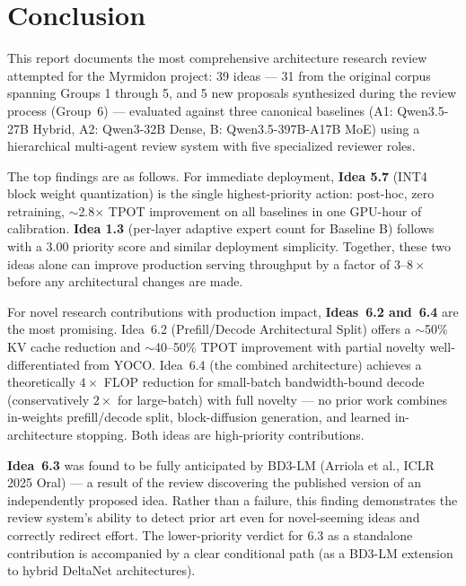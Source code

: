 \documentclass[11pt]{article}
\begin{document}
\section{Conclusion}
\label{sec:conclusion}

This report documents the most comprehensive architecture research review attempted for the Myrmidon project: 39 ideas --- 31 from the original corpus spanning Groups 1 through 5, and 5 new proposals synthesized during the review process (Group~6) --- evaluated against three canonical baselines (A1: Qwen3.5-27B Hybrid, A2: Qwen3-32B Dense, B: Qwen3.5-397B-A17B MoE) using a hierarchical multi-agent review system with five specialized reviewer roles.

The top findings are as follows. For immediate deployment, \textbf{Idea 5.7} (INT4 block weight quantization) is the single highest-priority action: post-hoc, zero retraining, $\sim$2.8$\times$ TPOT improvement on all baselines in one GPU-hour of calibration. \textbf{Idea 1.3} (per-layer adaptive expert count for Baseline B) follows with a 3.00 priority score and similar deployment simplicity. Together, these two ideas alone can improve production serving throughput by a factor of $3$--$8\times$ before any architectural changes are made.

For novel research contributions with production impact, \textbf{Ideas~6.2 and~6.4} are the most promising. Idea~6.2 (Prefill/Decode Architectural Split) offers a $\sim$50\% KV cache reduction and $\sim$40--50\% TPOT improvement with partial novelty well-differentiated from YOCO. Idea~6.4 (the combined architecture) achieves a theoretically $4\times$ FLOP reduction for small-batch bandwidth-bound decode (conservatively $2\times$ for large-batch) with full novelty --- no prior work combines in-weights prefill/decode split, block-diffusion generation, and learned in-architecture stopping. Both ideas are high-priority contributions.

\textbf{Idea~6.3} was found to be fully anticipated by BD3-LM (Arriola et al., ICLR 2025 Oral) --- a result of the review discovering the published version of an independently proposed idea. Rather than a failure, this finding demonstrates the review system's ability to detect prior art even for novel-seeming ideas and correctly redirect effort. The lower-priority verdict for 6.3 as a standalone contribution is accompanied by a clear conditional path (as a BD3-LM extension to hybrid DeltaNet architectures).
\end{document}

